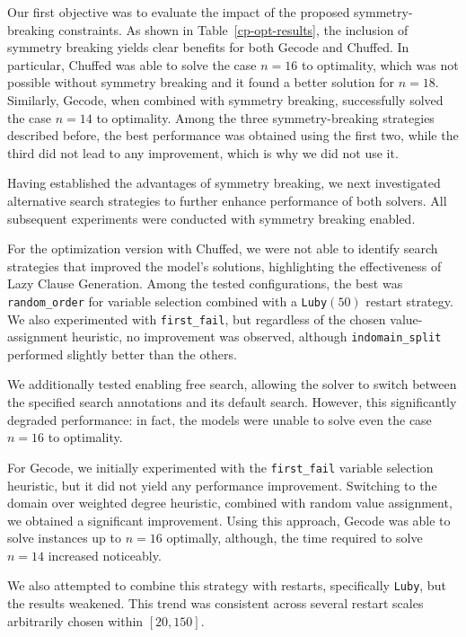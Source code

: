 Our first objective was to evaluate the impact of the proposed symmetry-breaking constraints. As shown in Table~\ref{cp-opt-results}, the inclusion of symmetry breaking yields clear benefits for both Gecode and Chuffed. In particular, Chuffed was able to solve the case $n=16$ to optimality, which was not possible without symmetry breaking and it found a better solution for $n=18$. Similarly, Gecode, when combined with symmetry breaking, successfully solved the case $n=14$ to optimality. Among the three symmetry-breaking strategies described before, the best performance was obtained using the first two, while the third did not lead to any improvement, which is why we did not use it.

Having established the advantages of symmetry breaking, we next investigated alternative search strategies to further enhance performance of both solvers. All subsequent experiments were conducted with symmetry breaking enabled.

For the optimization version with Chuffed, we were not able to identify search strategies that improved the model’s solutions, highlighting the effectiveness of Lazy Clause Generation. Among the tested configurations, the best was \texttt{random\_order} for variable selection combined with a \texttt{Luby$(50)$} restart strategy. We also experimented with \texttt{first\_fail}, but regardless of the chosen value-assignment heuristic, no improvement was observed, although \texttt{indomain\_split} performed slightly better than the others.

We additionally tested enabling free search, allowing the solver to switch between the specified search annotations and its default search. However, this significantly degraded performance: in fact, the models were unable to solve even the case $n=16$ to optimality.

For Gecode, we initially experimented with the \texttt{first\_fail} variable selection heuristic, but it did not yield any performance improvement. Switching to the domain over weighted degree heuristic, combined with random value assignment, we obtained a significant improvement. Using this approach, Gecode was able to solve instances up to $n=16$ optimally, although, the time required to solve $n=14$ increased noticeably.

We also attempted to combine this strategy with restarts, specifically \texttt{Luby}, but the results weakened. This trend was consistent across several restart scales arbitrarily chosen within $[20,150]$.

